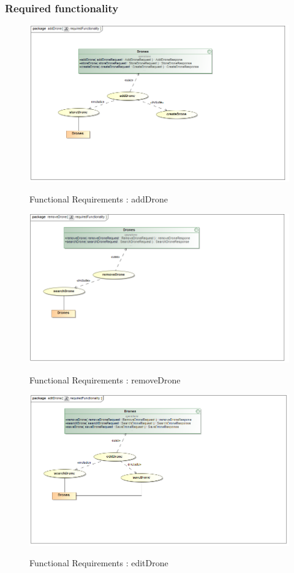 \documentclass{article}
\begin{document}
	\subsubsection{Required functionality}
	
		\begin{figure}[H]
			\includegraphics[width=\textwidth]{rf_add.png}  \\
			\caption{Functional Requirements : addDrone}
		\end{figure}
		\begin{figure}[H]
			\includegraphics[width=\textwidth]{rf_remove.png}  \\
			\caption{Functional Requirements : removeDrone}
		\end{figure}
		\begin{figure}[H]
			\includegraphics[width=\textwidth]{rf.png}  \\
			\caption{Functional Requirements : editDrone}
		\end{figure}
	
\end{document}
